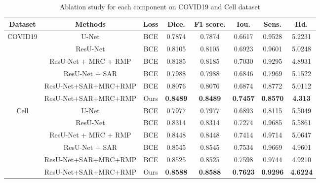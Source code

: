 \documentclass{ieeeaccess}
\begin{document}
  \begin{table}[htbp]
    \vspace{-2mm}
    \begin{center}\small
    \label{ablation-table}
    \begin{tabular}{cccccccc}
      
    \toprule
    Dataset & Methods & Loss & Dice. & F1 score. & Iou. & Sens. & Hd.\\
    \midrule
    \multirow{6}{*}{COVID19} & U-Net                & BCE  & 0.7874          & 0.7874          & 0.6617          & 0.9528          & 5.2231        \\
                             & ResU-Net             & BCE  & 0.8105          & 0.8105          & 0.6923          & 0.9601          & 5.0248        \\
                               & ResU-Net + MRC + RMP & BCE  & 0.8185          & 0.8185          & 0.7030          & 0.9295          & 4.8931        \\
                               & ResU-Net + SAR       & BCE  & 0.7988          & 0.7988          & 0.6846          & 0.7969          & 5.1522        \\  %
                               & ResU-Net+SAR+MRC+RMP & BCE  & 0.8076          & 0.8076          & 0.6874          & 0.8772          & 5.0112        \\
                               & ResU-Net+SAR+MRC+RMP & Ours & \textbf{0.8489} & \textbf{0.8489} & \textbf{0.7457} & \textbf{0.8570} & \textbf{4.313}\\
    \hline
    \multirow{6}{*}{Cell} & U-Net                & BCE & 0.7977 & 0.7977 & 0.6893 & 0.8115 & 5.5049\\
                               & ResU-Net             & BCE & 0.8314 & 0.8314 & 0.7274 & 0.9685 & 5.5861\\
                               & ResU-Net + MRC + RMP & BCE & 0.8448 & 0.8448 & 0.7414 & 0.9714 & 5.0647\\
                               & ResU-Net + SAR       & BCE & 0.8545 & 0.8545 & 0.7534 & 0.9669 & 4.9601\\
                               & ResU-Net+SAR+MRC+RMP & BCE & 0.8525 & 0.8525 & 0.7598 & 0.9744 & 4.9210\\
                               & ResU-Net+SAR+MRC+RMP & Ours & \textbf{0.8588} & \textbf{0.8588} & \textbf{0.7623} & \textbf{0.9296} & \textbf{4.6224}\\
  \bottomrule    
    \end{tabular}
    \caption{Ablation study for each component on COVID19 and Cell dataset}
  \end{center}
    \vspace{-4mm}
  \end{table}
\end{document}
